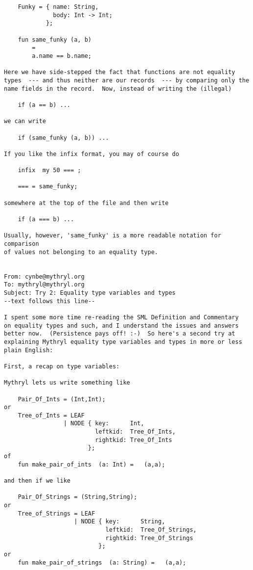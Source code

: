 \begin{verbatim}
    Funky = { name: String, 
              body: Int -> Int; 
            }; 

    fun same_funky (a, b) 
        = 
        a.name == b.name; 

Here we have side-stepped the fact that functions are not equality 
types  --- and thus neither are our records  --- by comparing only the 
name fields in the record.  Now, instead of writing the (illegal) 

    if (a == b) ... 

we can write 

    if (same_funky (a, b)) ... 

If you like the infix format, you may of course do 

    infix  my 50 === ; 

    === = same_funky; 

somewhere at the top of the file and then write  

    if (a === b) ... 

Usually, however, 'same_funky' is a more readable notation for comparison 
of values not belonging to an equality type. 


From: cynbe@mythryl.org 
To: mythryl@mythryl.org 
Subject: Try 2: Equality type variables and types 
--text follows this line-- 

I spent some more time re-reading the SML Definition and Commentary 
on equality types and such, and I understand the issues and answers 
better now.  (Persistence pays off! :-)  So here's a second try at 
explaining Mythryl equality type variables and types in more or less 
plain English: 

First, a recap on type variables: 

Mythryl lets us write something like 

    Pair_Of_Ints = (Int,Int); 
or 
    Tree_of_Ints = LEAF 
                 | NODE { key:      Int, 
                          leftkid:  Tree_Of_Ints, 
                          rightkid: Tree_Of_Ints 
                        }; 
of 
    fun make_pair_of_ints  (a: Int) =   (a,a); 

and then if we like 

    Pair_Of_Strings = (String,String); 
or 
    Tree_of_Strings = LEAF 
                    | NODE { key:      String, 
                             leftkid:  Tree_Of_Strings, 
                             rightkid: Tree_Of_Strings 
                           }; 
or 
    fun make_pair_of_strings  (a: String) =   (a,a); 



\end{verbatim}

